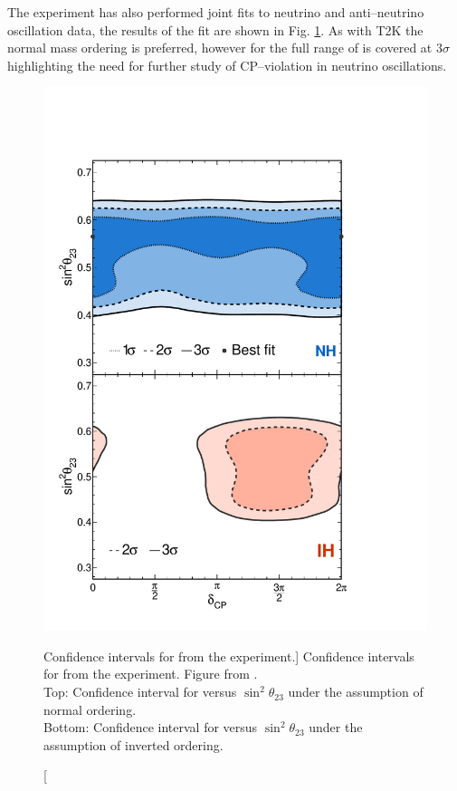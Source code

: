 The \nova{} experiment has also performed joint fits to neutrino and
anti--neutrino oscillation data, the results of the fit are shown in Fig.
\ref{fig:nova_cp}. As with T2K the normal mass ordering is preferred, however
for \nova{} the full range of \dcp{} is covered at $3\sigma$ highlighting the 
need for further study of CP--violation in neutrino 
oscillations\cite{PhysRevLett.123.151803}.

\begin{figure}
	\centering
	\includegraphics[height=0.7\textheight]{figures/nova_dcp.pdf}
	\caption
	[Confidence intervals for \dcp{} from the \nova{} experiment.]
	{Confidence intervals for \dcp{} from the \nova{} experiment. Figure from 
	\cite{PhysRevLett.123.151803}. \\
	Top: Confidence interval for \dcp{} versus $\sin^2\theta_{23}$ under the
	assumption of normal ordering.\\
	Bottom: Confidence interval for \dcp{} versus $\sin^2\theta_{23}$ under the
	assumption of inverted ordering.\\
	}
	\label{fig:nova_cp}
\end{figure}

